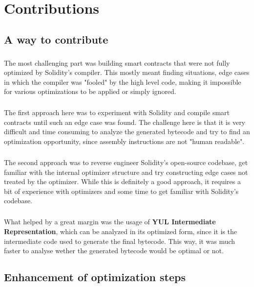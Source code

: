 \chapter{Contributions}

\section{A way to contribute}
\paragraph*{}
The most challenging part was building smart contracts that were not fully optimized by Solidity's compiler. This mostly meant finding situations, edge cases in which the compiler was "fooled" by the high level code, making it impossible for various optimizations to be applied or simply ignored.

\paragraph*{}
The first approach here was to experiment with Solidity and compile smart contracts until such an edge case was found. The challenge here is that it is very difficult and time consuming to analyze the generated bytecode and try to find an optimization opportunity, since assembly instructions are not "human readable".

\paragraph*{}
The second approach was to reverse engineer Solidity's open-source codebase, get familiar with the internal optimizer structure and try constructing edge cases not treated by the optimizer. While this is definitely a good approach, it requires a bit of experience with optimizers and some time to get familiar with Solidity's codebase.

\paragraph*{}
What helped by a great margin was the usage of \textbf{YUL Intermediate Representation}, which can be analyzed in its optimized form, since it is the intermediate code used to generate the final bytecode. This way, it was much faster to analyse wether the generated bytecode would be optimal or not.

\section{Enhancement of optimization steps}

